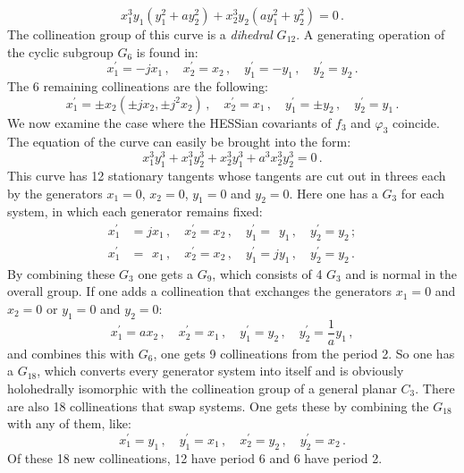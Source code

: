 \documentclass[leqno]{article}
\begin{document}
\begin{equation}\label{eq: 5.11}
x_1^3 y_1 (y_1^2 + a y_2^2) + x_2^3 y_2 (a y_1^2 + y_2^2) = 0 \, . \tag{11}
\end{equation}
The collineation group of this curve is a \textit{dihedral} $G_{12}$. A generating operation of the cyclic subgroup $G_6$ is found in:
\[
x_1^\prime = -j x_1 \, , \quad x_2^\prime = x_2 \, , \quad y_1^\prime =-y_1 \, , \quad y_2^\prime = y_2 \, .
\]
The 6 remaining collineations are the following:
\[
x_1^\prime = \pm x_2(\pm j x_2 , \pm j^2 x_2) \, , \quad x_2^\prime = x_1 \, , \quad y_1^\prime = \pm y_2 \, , \quad y_2^\prime = y_1 \, . 
\]
We now examine the case where the HESSian covariants of $f_3$ and $\varphi_3$ coincide. The equation of the curve can easily be brought into the form:
\begin{equation}\label{eq: 5.12}
x_1^3 y_1^3 + x_1^3 y_2^3 + x_2^3 y_1^3 + a^3 x_2^3 y_2^3 = 0 \, . \tag{12}
\end{equation}
This curve has 12 stationary tangents whose tangents are cut out in threes each by the generators $x_1=0$, $x_2=0$, $y_1=0$ and $y_2=0$. Here one has a $G_3$ for each system, in which each generator remains fixed:
\begin{align*}
	x_1^\prime &= j x_1 \, , \quad  x_2^\prime = x_2 \, , \quad y_1^\prime = \phantom{j} y_1 \, , \quad y_2^\prime = y_2 \, ; \\
	x_1^\prime &= \phantom{j} x_1 \, , \quad x_2^\prime = x_2 \, , \quad y_1^\prime = j y_1 \, , \quad y_2^\prime = y_2 \, .
\end{align*}
By combining these $G_3$ one gets a $G_9$, which consists of 4 $G_3$ and is normal in the overall group. If one adds a collineation that exchanges the generators $x_1 = 0$ and $x_2 = 0$ or $y_1 = 0$ and $y_2 = 0$: 
\[
x_1^\prime = a x_2 \, , \quad x_2^\prime = x_1 \, , \quad y_1^\prime = y_2 \, , \quad y_2^\prime = \frac{1}{a} y_1 \, , 
\]
and combines this with $G_6$, one gets 9 collineations from the period 2. So one has a $G_{18}$, which converts every generator system into itself and is obviously holohedrally isomorphic with the collineation group of a general planar $C_3$. There are also 18 collineations that swap systems. One gets these by combining the $G_{18}$ with any of them, like:
\[
x_1^\prime = y_1 \, , \quad y_1^\prime = x_1 \, , \quad x_2^\prime = y_2 \, , \quad y_2^\prime = x_2 \, . 
\]
Of these 18 new collineations, 12 have period 6 and 6 have period 2. \\
\end{document}
